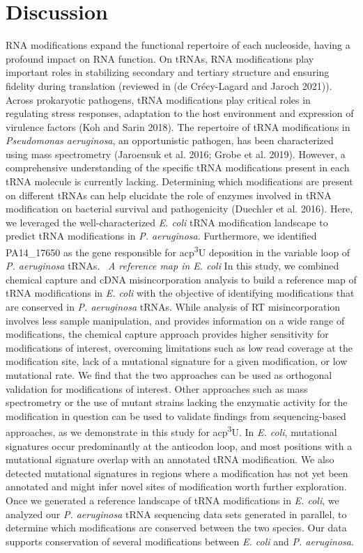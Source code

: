 \documentclass[times, twoside]{zHenriquesLab-StyleBioRxiv}
\begin{document}
\section*{Discussion}
RNA modifications expand the functional repertoire of each nucleoside, having a profound impact on RNA function. On tRNAs, RNA modifications play important roles in stabilizing secondary and tertiary structure and ensuring fidelity during translation (reviewed in (de Crécy-Lagard and Jaroch 2021)). Across prokaryotic pathogens, tRNA modifications play critical roles in regulating stress responses, adaptation to the host environment and expression of virulence factors (Koh and Sarin 2018). The repertoire of tRNA modifications in \textit{Pseudomonas aeruginosa}, an opportunistic pathogen, has been characterized using mass spectrometry (Jaroensuk et al. 2016; Grobe et al. 2019). However, a comprehensive understanding of the specific tRNA modifications present in each tRNA molecule is currently lacking. Determining which modifications are present on different tRNAs can help elucidate the role of enzymes involved in tRNA modification on bacterial survival and pathogenicity (Duechler et al. 2016). Here, we leveraged the well-characterized \textit{E. coli }tRNA modification landscape to predict tRNA modifications in \textit{P. aeruginosa}. Furthermore, we identified PA14\_17650 as the gene responsible for acp\textsuperscript{3}U deposition in the variable loop of \textit{P. aeruginosa }tRNAs. 
\newline
\newline
\textit{A reference map in E. coli}
\newline
In this study, we combined chemical capture and cDNA misincorporation analysis to build a reference map of tRNA modifications in \textit{E. coli }with the objective of identifying modifications that are conserved in \textit{P. aeruginosa }tRNAs. While analysis of RT misincorporation involves less sample manipulation, and provides information on a wide range of modifications, the chemical capture approach provides higher sensitivity for modifications of interest, overcoming limitations such as low read coverage at the modification site, lack of a mutational signature for a given modification, or low mutational rate. We find that the two approaches can be used as orthogonal validation for modifications of interest. Other approaches such as mass spectrometry or the use of mutant strains lacking the enzymatic activity for the modification in question can be used to validate findings from sequencing-based approaches, as we demonstrate in this study for acp\textsuperscript{3}U. In \textit{E. coli}, mutational signatures occur predominantly at the anticodon loop, and most positions with a mutational signature overlap with an annotated tRNA modification. We also detected mutational signatures in regions where a modification has not yet been annotated and might infer novel sites of modification worth further exploration. Once we generated a reference landscape of tRNA modifications in \textit{E. coli}, we analyzed our \textit{P. aeruginosa} tRNA sequencing data sets generated in parallel, to determine which modifications are conserved between the two species. Our data supports conservation of several modifications between \textit{E. coli} and \textit{P. aeruginosa}. 
\end{document}
